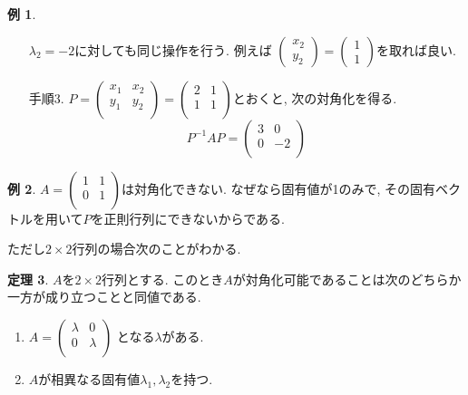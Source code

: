 \documentclass[dvipdfmx,a4paper,11pt]{article}
\theoremstyle{definition}
\newtheorem{thm}{定理}
\newtheorem{exa}[thm]{例}
\begin{document}
\begin{exa}
\begin{enumerate}
 $\lambda_2 = -2$に対しても同じ操作を行う. 例えば
$ \begin{pmatrix}
x_2 \\ y_2
 \end{pmatrix}  
  =
  \begin{pmatrix}
1 \\ 1
 \end{pmatrix}  
 $を取れば良い. 

 
\item[手順3.]  
$P=\begin{pmatrix}
x_1& x_2 \\
y_1& y_2 \\
\end{pmatrix}
=\begin{pmatrix}
2& 1 \\
1& 1 \\
\end{pmatrix}
$とおくと, 次の対角化を得る.
$$
P^{-1} A P=
\begin{pmatrix}
3& 0 \\
0& -2\\
\end{pmatrix}
$$ 
\end{enumerate}
\end{exa}

\begin{exa}
$A=\begin{pmatrix}
1& 1 \\
0& 1\\
\end{pmatrix}$は対角化できない. 
なぜなら固有値が1のみで, その固有ベクトルを用いて$P$を正則行列にできないからである. 
\end{exa}

ただし$2 \times 2$行列の場合次のことがわかる. 


\begin{tcolorbox}[
    colback = white,
    colframe = green!35!black,
    fonttitle = \bfseries,
    breakable = true]
    \begin{thm}
$A$を$2 \times 2$行列とする.
このとき$A$が対角化可能であることは次のどちらか一方が成り立つことと同値である.
\begin{enumerate}
\setlength{\parskip}{0cm}
 \setlength{\itemsep}{0pt} 
\item $A = \begin{pmatrix}
\lambda& 0 \\
0& \lambda\\
\end{pmatrix}
$
となる$\lambda$がある.
\item $A$が相異なる固有値$\lambda_1, \lambda_2$を持つ. 
\end{enumerate}

\end{thm}
 \end{tcolorbox}
 
\end{document}
